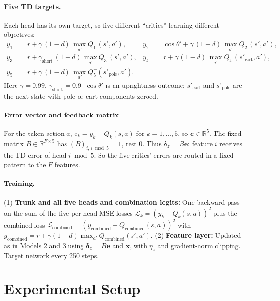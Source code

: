 \documentclass[11pt]{article}
\begin{document}
\paragraph{Five TD targets.} Each head has its own target, so five different ``critics'' learning different objectives:
\begin{align}
y_1 &= r + \gamma\,(1-d)\,\max_{a'} Q_1^-(s',a'), &
y_2 &= \cos\theta' + \gamma\,(1-d)\,\max_{a'} Q_2^-(s',a'), \\
y_3 &= r + \gamma_{\text{short}}\,(1-d)\,\max_{a'} Q_3^-(s',a'), &
y_4 &= r + \gamma\,(1-d)\,\max_{a'} Q_4^-(s'_{\text{cart}},a'), \\
y_5 &= r + \gamma\,(1-d)\,\max_{a'} Q_5^-(s'_{\text{pole}},a').
\end{align}
Here $\gamma = 0.99$, $\gamma_{\text{short}} = 0.9$; $\cos\theta'$ is an uprightness outcome; $s'_{\text{cart}}$ and $s'_{\text{pole}}$ are the next state with pole or cart components zeroed.

\paragraph{Error vector and feedback matrix.} For the taken action $a$, $e_k = y_k - Q_k(s,a)$ for $k=1,\ldots,5$, so $\mathbf{e} \in \mathbb{R}^5$. The fixed matrix $B \in \mathbb{R}^{F \times 5}$ has $(B)_{i,\, i \bmod 5} = 1$, rest 0. Thus $\boldsymbol{\delta}_z = B\mathbf{e}$: feature $i$ receives the TD error of head $i \bmod 5$. So the five critics' errors are routed in a fixed pattern to the $F$ features.

\paragraph{Training.} (1) \textbf{Trunk and all five heads and combination logits:} One backward pass on the sum of the five per-head MSE losses $\mathcal{L}_k = (y_k - Q_k(s,a))^2$ plus the combined loss $\mathcal{L}_{\text{combined}} = (y_{\text{combined}} - Q_{\text{combined}}(s,a))^2$ with $y_{\text{combined}} = r + \gamma(1-d) \max_{a'} Q_{\text{combined}}^-(s',a')$. (2) \textbf{Feature layer:} Updated as in Models 2 and 3 using $\boldsymbol{\delta}_z = B\mathbf{e}$ and $\mathbf{x}$, with $\eta_z$ and gradient-norm clipping. Target network every 250 steps.

\section{Experimental Setup}
\end{document}
